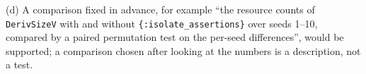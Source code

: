 \documentclass[11pt]{article}
\begin{document}
\begin{answer}
(d) A comparison fixed in advance, for example ``the resource counts of
\texttt{DerivSizeV} with and without \texttt{\{:isolate\_assertions\}} over seeds
1--10, compared by a paired permutation test on the per-seed differences'',
would be supported; a comparison chosen after looking at the numbers is a
description, not a test.
\end{answer}
\end{document}
